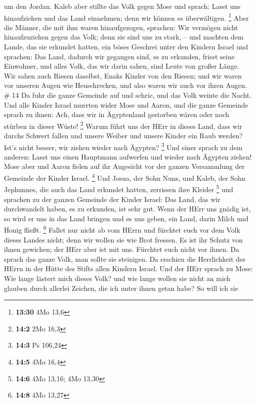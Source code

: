 um den Jordan.  Kaleb aber stillte das Volk gegen Mose und
sprach: Lasst uns hinaufziehen und das Land einnehmen; denn wir können
es überwältigen. \footnote{\textbf{13:30} 4Mo 13,6}  Aber
die Männer, die mit ihm waren hinaufgezogen, sprachen: Wir vermögen
nicht hinaufzuziehen gegen das Volk; denn sie sind uns zu stark, --
 und machten dem Lande, das sie erkundet hatten, ein böses
Geschrei unter den Kindern Israel und sprachen: Das Land, dadurch wir
gegangen sind, es zu erkunden, frisst seine Einwohner, und alles Volk,
das wir darin sahen, sind Leute von großer Länge.  Wir
sahen auch Riesen daselbst, Enaks Kinder von den Riesen; und wir waren
vor unseren Augen wie Heuschrecken, und also waren wir auch vor ihren
Augen. \# 14  Da fuhr die ganze Gemeinde auf und schrie, und
das Volk weinte die Nacht.  Und alle Kinder Israel murrten
wider Mose und Aaron, und die ganze Gemeinde sprach zu ihnen: Ach, dass
wir in Ägyptenland gestorben wären oder noch stürben in dieser Wüste!
\footnote{\textbf{14:2} 2Mo 16,3}  Warum führt uns der HErr
in dieses Land, dass wir durchs Schwert fallen und unsere Weiber und
unsere Kinder ein Raub werden? Ist's nicht besser, wir ziehen wieder
nach Ägypten? \footnote{\textbf{14:3} Ps 106,24}  Und einer
sprach zu dem anderen: Lasst uns einen Hauptmann aufwerfen und wieder
nach Ägypten ziehen!  Mose aber und Aaron fielen auf ihr
Angesicht vor der ganzen Versammlung der Gemeinde der Kinder Israel.
\footnote{\textbf{14:5} 4Mo 16,4}  Und Josua, der Sohn Nuns,
und Kaleb, der Sohn Jephunnes, die auch das Land erkundet hatten,
zerrissen ihre Kleider \footnote{\textbf{14:6} 4Mo 13,16; 4Mo 13,30}
 und sprachen zu der ganzen Gemeinde der Kinder Israel: Das
Land, das wir durchwandelt haben, es zu erkunden, ist sehr gut.
 Wenn der HErr uns gnädig ist, so wird er uns in das Land
bringen und es uns geben, ein Land, darin Milch und Honig fließt.
\footnote{\textbf{14:8} 4Mo 13,27}  Fallet nur nicht ab vom
HErrn und fürchtet euch vor dem Volk dieses Landes nicht; denn wir
wollen sie wie Brot fressen. Es ist ihr Schutz von ihnen gewichen; der
HErr aber ist mit uns. Fürchtet euch nicht vor ihnen.  Da
sprach das ganze Volk, man sollte sie steinigen. Da erschien die
Herrlichkeit des HErrn in der Hütte des Stifts allen Kindern Israel.
 Und der HErr sprach zu Mose: Wie lange lästert mich dieses
Volk? und wie lange wollen sie nicht an mich glauben durch allerlei
Zeichen, die ich unter ihnen getan habe?  So will ich sie
